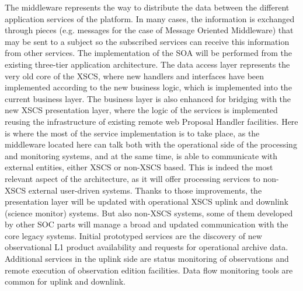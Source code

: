 The middleware represents the way to distribute the data between the different application services of the platform. In many cases, the information is exchanged through pieces (e.g. messages for the case of Message Oriented Middleware) that may be sent to a subject so the subscribed services can receive this information from other services. The implementation of the SOA will be performed from the existing three-tier application architecture. The data access layer represents the very old core of the XSCS, where new handlers and interfaces have been implemented according to the new business logic, which is implemented into the current business layer. The business layer is also enhanced for bridging with the new XSCS presentation layer, where the logic of the services is implemented reusing the infrastructure of existing remote web Proposal Handler facilities. Here is where the most of the service implementation is to take place, as the middleware located here can talk both with the operational side of the processing and monitoring systems, and at the same time, is able to communicate with external entities, either XSCS or non-XSCS based. This is indeed the most relevant aspect of the architecture, as it will offer processing services to non-XSCS external user-driven systems. Thanks to those improvements, the presentation layer will be updated with operational XSCS uplink and downlink (science monitor) systems. But also non-XSCS systems, some of them developed by other SOC parts will manage a broad and updated communication with the core legacy systems. Initial prototyped services are the discovery of new observational L1 product availability and requests for operational archive data. Additional services in the uplink side are status monitoring of observations and remote execution of observation edition facilities. Data flow monitoring tools are common for uplink and downlink. 

